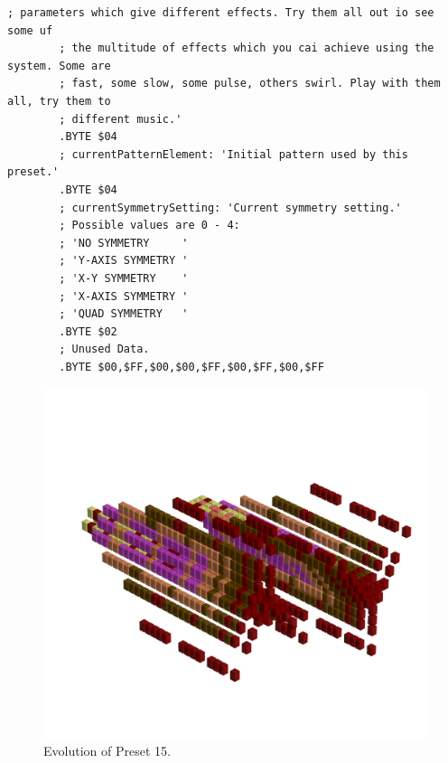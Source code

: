 \begin{lstlisting}[basicstyle=\tiny,caption=Source code for Preset 14.]
        ; parameters which give different effects. Try them all out io see some uf
        ; the multitude of effects which you cai achieve using the system. Some are
        ; fast, some slow, some pulse, others swirl. Play with them all, try them to
        ; different music.'
        .BYTE $04
        ; currentPatternElement: 'Initial pattern used by this preset.'
        .BYTE $04
        ; currentSymmetrySetting: 'Current symmetry setting.'
        ; Possible values are 0 - 4:
        ; 'NO SYMMETRY     '
        ; 'Y-AXIS SYMMETRY '
        ; 'X-Y SYMMETRY    '
        ; 'X-AXIS SYMMETRY '
        ; 'QUAD SYMMETRY   '
        .BYTE $02
        ; Unused Data.
        .BYTE $00,$FF,$00,$00,$FF,$00,$FF,$00,$FF
\end{lstlisting}


\clearpage                                                                 
\begin{figure}[H]                                                          
    \centering                                                             
    \begin{adjustbox}{width=14cm,center}                                   
      \includegraphics[width=14cm]{src/presets/pattern14-45.png}%
    \end{adjustbox}                                                        
\caption{Evolution of Preset 15.}                                           
\end{figure}                                                               
\clearpage                                                                 
                                                                           
